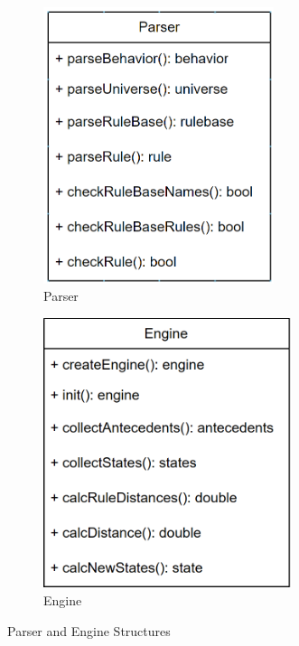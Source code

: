 \begin{figure}[!h]
\centering
\begin{subfigure}{.5\textwidth}
	\centering
	\includegraphics[width=0.74\textwidth]{images/parserUML}
	\caption{Parser}
	\label{fig:parserUML}
\end{subfigure}%
\begin{subfigure}{.5\textwidth}
	\centering
	\includegraphics[width=0.8\textwidth]{images/engineUML}
	\caption{Engine}
	\label{fig:engineUML}
\end{subfigure}
\caption{Parser and Engine Structures}
\label{fig:paserengine}
\end{figure}

